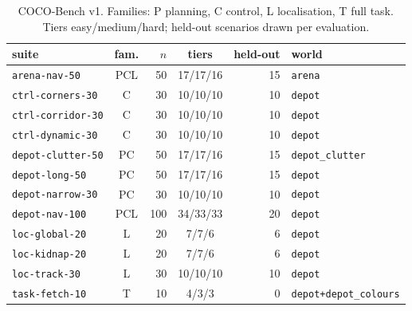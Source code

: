 \begin{table}[t]
\centering
\small
\caption{COCO-Bench v1. Families: P planning, C control, L localisation, T full task. Tiers easy/medium/hard; held-out scenarios drawn per evaluation.}
\label{tab:suites}
\setlength{\tabcolsep}{3pt}
\begin{tabular}{lcrcrl}
\toprule
suite & fam. & $n$ & tiers & held-out & world \\
\midrule
\texttt{arena-nav-50} & PCL & 50 & 17/17/16 & 15 & \texttt{arena} \\
\texttt{ctrl-corners-30} & C & 30 & 10/10/10 & 10 & \texttt{depot} \\
\texttt{ctrl-corridor-30} & C & 30 & 10/10/10 & 10 & \texttt{depot} \\
\texttt{ctrl-dynamic-30} & C & 30 & 10/10/10 & 10 & \texttt{depot} \\
\texttt{depot-clutter-50} & PC & 50 & 17/17/16 & 15 & \texttt{depot\_clutter} \\
\texttt{depot-long-50} & PC & 50 & 17/17/16 & 15 & \texttt{depot} \\
\texttt{depot-narrow-30} & PC & 30 & 10/10/10 & 10 & \texttt{depot} \\
\texttt{depot-nav-100} & PCL & 100 & 34/33/33 & 20 & \texttt{depot} \\
\texttt{loc-global-20} & L & 20 & 7/7/6 & 6 & \texttt{depot} \\
\texttt{loc-kidnap-20} & L & 20 & 7/7/6 & 6 & \texttt{depot} \\
\texttt{loc-track-30} & L & 30 & 10/10/10 & 10 & \texttt{depot} \\
\texttt{task-fetch-10} & T & 10 & 4/3/3 & 0 & \texttt{depot+depot\_colours} \\
\bottomrule
\end{tabular}
\end{table}
